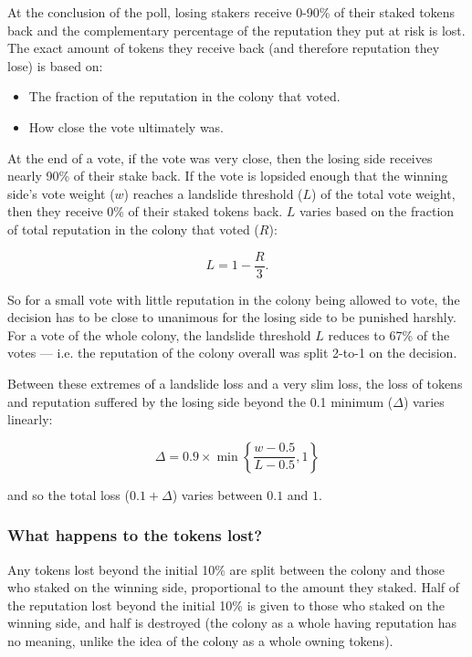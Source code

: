 At the conclusion of the poll, losing stakers receive 0-90\% of their staked tokens back and the complementary percentage of the reputation they put at risk is lost. The exact amount of tokens they receive back (and therefore reputation they lose) is based on:

\begin{itemize}
 \item The fraction of the reputation in the colony that voted.
 \item How close the vote ultimately was.
\end{itemize}

At the end of a vote, if the vote was very close, then the losing side receives nearly 90\% of their stake back. If the vote is lopsided enough that the winning side's vote weight ($w$) reaches a landslide threshold ($L$) of the total vote weight, then they receive 0\% of their staked tokens back. $L$ varies based on the fraction of total reputation in the colony that voted ($R$):

\begin{equation}
L = 1 - \frac{R}{3}.
\end{equation}

So for a small vote with little reputation in the colony being allowed to vote, the decision has to be close to unanimous for the losing side to be punished harshly. For a vote of the whole colony, the landslide threshold $L$ reduces to 67\% of the votes --- i.e. the reputation of the colony overall was split 2-to-1 on the decision.

Between these extremes of a landslide loss and a very slim loss, the loss of tokens and reputation suffered by the losing side beyond the 0.1 minimum ($\Delta$) varies linearly:

\begin{equation}
 \Delta = 0.9 \times \min \left\lbrace \frac{w-0.5}{L-0.5}, 1 \right\rbrace    
\end{equation}

\noindent and so the total loss ($0.1 + \Delta$) varies between $0.1$ and $1$.

\subsubsection*{What happens to the tokens lost?}
Any tokens lost beyond the initial 10\% are split between the colony and those who staked on the winning side, proportional to the amount they staked. Half of the reputation lost beyond the initial 10\% is given to those who staked on the winning side, and half is destroyed (the colony as a whole having reputation has no meaning, unlike the idea of the colony as a whole owning tokens).

